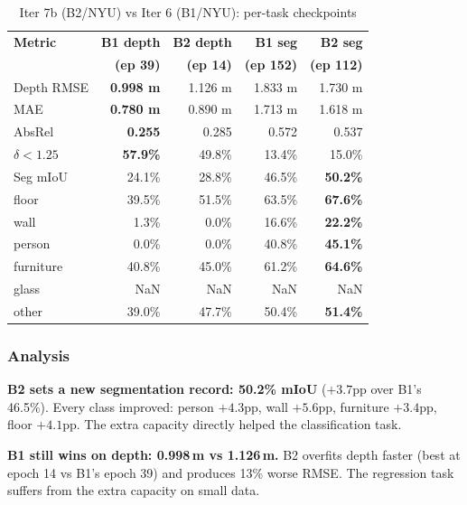\documentclass[11pt,a4paper]{article}
\begin{document}
\begin{table}[h]
\centering
\caption{Iter 7b (B2/NYU) vs Iter 6 (B1/NYU): per-task checkpoints}
\label{tab:b2-eval}
\begin{tabular}{lrrrr}
\toprule
\textbf{Metric} & \textbf{B1 depth} & \textbf{B2 depth} & \textbf{B1 seg} & \textbf{B2 seg} \\
                 & \textbf{(ep 39)} & \textbf{(ep 14)} & \textbf{(ep 152)} & \textbf{(ep 112)} \\
\midrule
Depth RMSE       & \textcolor{improved}{\textbf{0.998 m}} & 1.126 m & 1.833 m & 1.730 m \\
MAE              & \textcolor{improved}{\textbf{0.780 m}} & 0.890 m & 1.713 m & 1.618 m \\
AbsRel           & \textcolor{improved}{\textbf{0.255}}   & 0.285   & 0.572   & 0.537 \\
$\delta < 1.25$  & \textcolor{improved}{\textbf{57.9\%}}  & 49.8\%  & 13.4\%  & 15.0\% \\
\midrule
Seg mIoU         & 24.1\% & 28.8\% & 46.5\% & \textcolor{improved}{\textbf{50.2\%}} \\
\quad floor      & 39.5\% & 51.5\% & 63.5\% & \textcolor{improved}{\textbf{67.6\%}} \\
\quad wall       & 1.3\%  & 0.0\%  & 16.6\% & \textcolor{improved}{\textbf{22.2\%}} \\
\quad person     & 0.0\%  & 0.0\%  & 40.8\% & \textcolor{improved}{\textbf{45.1\%}} \\
\quad furniture  & 40.8\% & 45.0\% & 61.2\% & \textcolor{improved}{\textbf{64.6\%}} \\
\quad glass      & NaN    & NaN    & NaN    & NaN \\
\quad other      & 39.0\% & 47.7\% & 50.4\% & \textcolor{improved}{\textbf{51.4\%}} \\
\bottomrule
\end{tabular}
\end{table}

\subsubsection{Analysis}

\textbf{B2 sets a new segmentation record: 50.2\% mIoU} ($+3.7$pp over
B1's 46.5\%). Every class improved: person $+4.3$pp, wall $+5.6$pp,
furniture $+3.4$pp, floor $+4.1$pp. The extra capacity directly helped
the classification task.

\textbf{B1 still wins on depth: 0.998\,m vs 1.126\,m.} B2 overfits
depth faster (best at epoch 14 vs B1's epoch 39) and produces 13\%
worse RMSE. The regression task suffers from the extra capacity on
small data.
\end{document}
